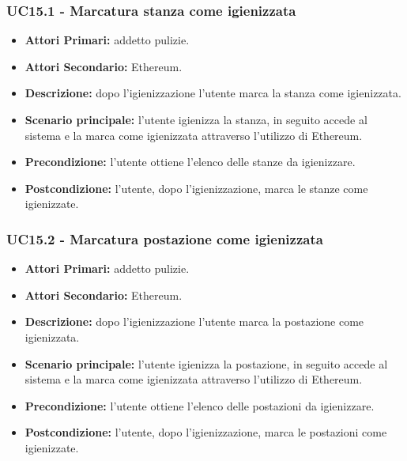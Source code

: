 \subsubsection{UC15.1 - Marcatura stanza come igienizzata}
\begin{itemize}
           	\item\textbf{Attori Primari:} addetto pulizie.
		\item\textbf{Attori Secondario:} Ethereum.
           	\item\textbf{Descrizione:} dopo l'igienizzazione l'utente marca la stanza come igienizzata.
           	\item\textbf{Scenario principale:} l'utente igienizza la stanza, in seguito accede al sistema e la marca come igienizzata attraverso l'utilizzo di Ethereum.
           	\item\textbf{Precondizione:} l'utente ottiene l'elenco delle stanze da igienizzare.
           	\item\textbf{Postcondizione:} l'utente, dopo l'igienizzazione, marca le stanze come igienizzate.
\end{itemize}
\subsubsection{UC15.2 - Marcatura postazione come igienizzata}
\begin{itemize}
           	\item\textbf{Attori Primari:} addetto pulizie.
		\item\textbf{Attori Secondario:} Ethereum.
           	\item\textbf{Descrizione:} dopo l'igienizzazione l'utente marca la postazione come igienizzata.
           	\item\textbf{Scenario principale:} l'utente igienizza la postazione, in seguito accede al sistema e la marca come igienizzata attraverso l'utilizzo di Ethereum.
           	\item\textbf{Precondizione:} l'utente ottiene l'elenco delle postazioni da igienizzare.
           	\item\textbf{Postcondizione:} l'utente, dopo l'igienizzazione, marca le postazioni come igienizzate.
\end{itemize}
